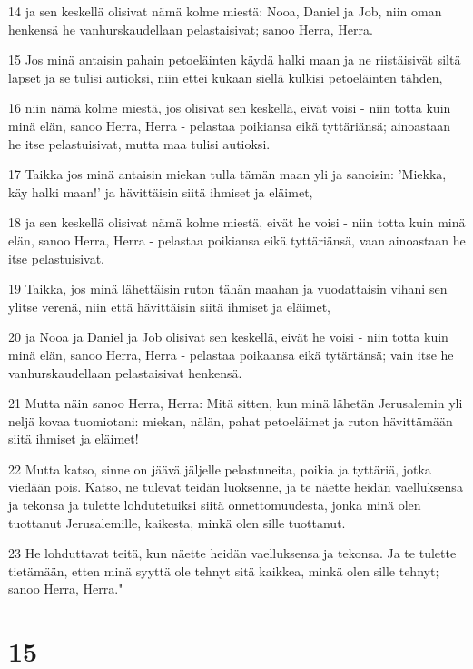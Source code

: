 \par 14 ja sen keskellä olisivat nämä kolme miestä: Nooa, Daniel ja Job, niin oman henkensä he vanhurskaudellaan pelastaisivat; sanoo Herra, Herra.
\par 15 Jos minä antaisin pahain petoeläinten käydä halki maan ja ne riistäisivät siltä lapset ja se tulisi autioksi, niin ettei kukaan siellä kulkisi petoeläinten tähden,
\par 16 niin nämä kolme miestä, jos olisivat sen keskellä, eivät voisi - niin totta kuin minä elän, sanoo Herra, Herra - pelastaa poikiansa eikä tyttäriänsä; ainoastaan he itse pelastuisivat, mutta maa tulisi autioksi.
\par 17 Taikka jos minä antaisin miekan tulla tämän maan yli ja sanoisin: 'Miekka, käy halki maan!' ja hävittäisin siitä ihmiset ja eläimet,
\par 18 ja sen keskellä olisivat nämä kolme miestä, eivät he voisi - niin totta kuin minä elän, sanoo Herra, Herra - pelastaa poikiansa eikä tyttäriänsä, vaan ainoastaan he itse pelastuisivat.
\par 19 Taikka, jos minä lähettäisin ruton tähän maahan ja vuodattaisin vihani sen ylitse verenä, niin että hävittäisin siitä ihmiset ja eläimet,
\par 20 ja Nooa ja Daniel ja Job olisivat sen keskellä, eivät he voisi - niin totta kuin minä elän, sanoo Herra, Herra - pelastaa poikaansa eikä tytärtänsä; vain itse he vanhurskaudellaan pelastaisivat henkensä.
\par 21 Mutta näin sanoo Herra, Herra: Mitä sitten, kun minä lähetän Jerusalemin yli neljä kovaa tuomiotani: miekan, nälän, pahat petoeläimet ja ruton hävittämään siitä ihmiset ja eläimet!
\par 22 Mutta katso, sinne on jäävä jäljelle pelastuneita, poikia ja tyttäriä, jotka viedään pois. Katso, ne tulevat teidän luoksenne, ja te näette heidän vaelluksensa ja tekonsa ja tulette lohdutetuiksi siitä onnettomuudesta, jonka minä olen tuottanut Jerusalemille, kaikesta, minkä olen sille tuottanut.
\par 23 He lohduttavat teitä, kun näette heidän vaelluksensa ja tekonsa. Ja te tulette tietämään, etten minä syyttä ole tehnyt sitä kaikkea, minkä olen sille tehnyt; sanoo Herra, Herra."

\chapter{15}

